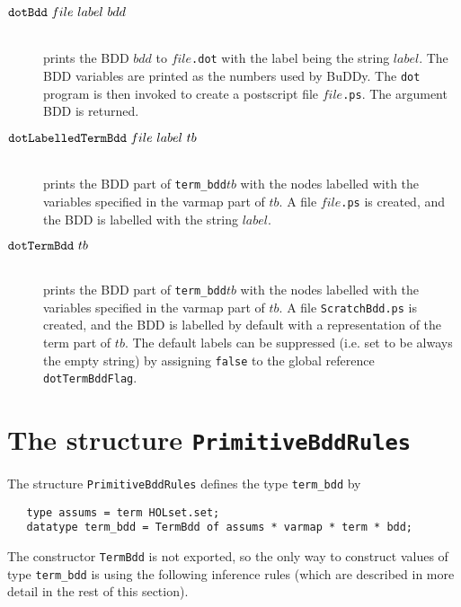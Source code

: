 \documentclass[12pt]{article}
\newcommand{\tyind}[1]{\index[MLty]{\texttt{#1}}}
\renewcommand{\t}[1]{\mbox{\tt #1}}
\newcommand{\ml}[1]{{\tt #1}}
\newcommand\termbddty{\texttt{term\_bdd}\xspace}
\newcommand{\Buddy}{BuDDy\xspace}
\begin{document}
\begin{description}
\item[$\t{dotBdd}~file~label~bdd$]\mbox{}\\
prints the BDD $bdd$ to $file$\t{.dot} with
the label being the string $label$. The BDD variables are printed as the numbers used by \Buddy.
The \t{dot} program is then invoked to create 
a postscript file $file$\t{.ps}. The argument BDD is returned.

\item[$\t{dotLabelledTermBdd}~file~label~tb$]\mbox{}\\
prints the
BDD part of \termbddty $tb$ with the nodes labelled with
the variables specified in the varmap part of $tb$. A file $file$\t{.ps}
is created, and the BDD is labelled with the string $label$.


\item[$\t{dotTermBdd}~tb$]\mbox{}\\
prints the
BDD part of \termbddty $tb$ with the nodes labelled with
the variables specified in the varmap part of $tb$. A file \t{ScratchBdd.ps}
is created, and the BDD is labelled by default with a representation
of the term part of $tb$. The default labels
can be suppressed (i.e. set to be always the empty string) by assigning \t{false}
to the global reference \t{dotTermBddFlag}.
\end{description}

\section{The structure \t{PrimitiveBddRules}}\label{PrimitiveBddRules}

The structure \ml{PrimitiveBddRules} defines the type \termbddty{} by

\vspace*{-2mm}

\begin{verbatim}
   type assums = term HOLset.set;
   datatype term_bdd = TermBdd of assums * varmap * term * bdd;
\end{verbatim}\tyind{term\_bdd}\tyind{assums}

\vspace*{-2mm}

The constructor \t{TermBdd} is not exported, so the only way to construct
values of type \termbddty is using the following inference rules
(which are described in more detail in the rest of this section).
\end{document}
